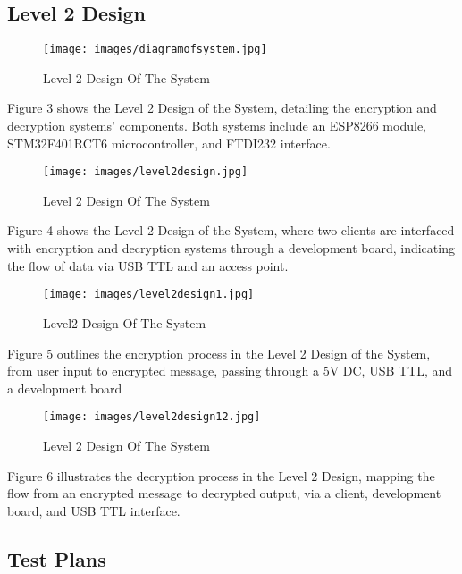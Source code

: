 \documentclass[12pt]{article}
\begin{document}
	\subsection{Level 2 Design}
	\begin{figure}[H]
		\centering
		\label{ Design Of The System}
		\texttt{[image: images/diagramofsystem.jpg]}\\[0.5 cm]	
		\caption{Level 2 Design Of The System} 		
	\end{figure}
	Figure 3 shows the Level 2 Design of the System, detailing the encryption and decryption systems' components. Both systems include an ESP8266 module, STM32F401RCT6 microcontroller, and FTDI232 interface.
	\begin{figure}[H]
		\centering
		\label{Level2 Design Of The System}
		\texttt{[image: images/level2design.jpg]}\\[0.5 cm]	
		\caption{Level 2 Design Of The System} 		
	\end{figure}
	Figure 4 shows the Level 2 Design of the System, where two clients are interfaced with encryption and decryption systems through a development board, indicating the flow of data via USB TTL and an access point.
	\begin{figure}[H]
		\centering
		\label{Level21 Design Of The System}
		\texttt{[image: images/level2design1.jpg]}\\[0.5 cm]	
		\caption{Level2 Design Of The System} 		
	\end{figure}
	Figure 5 outlines the encryption process in the Level 2 Design of the System, from user input to encrypted message, passing through a 5V DC, USB TTL, and a development board
	\begin{figure}[H]
		\centering
		\label{Level22 Design Of The System}
		\texttt{[image: images/level2design12.jpg]}\\[0.5 cm]	
		\caption{Level 2 Design Of The System} 		
	\end{figure}
	Figure 6 illustrates the decryption process in the Level 2 Design, mapping the flow from an encrypted message to decrypted output, via a client, development board, and USB TTL interface.
	\newpage
	\subsection{Test Plans}
\end{document}
